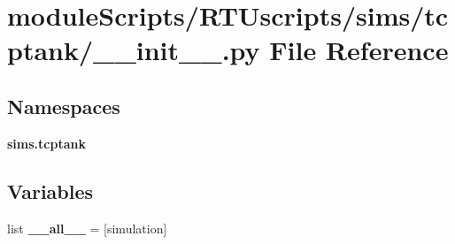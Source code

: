 \section{module\+Scripts/\+R\+T\+Uscripts/sims/tcptank/\+\_\+\+\_\+init\+\_\+\+\_\+.py File Reference}
\label{sims_2tcptank_2____init_____8py}
\subsection*{Namespaces}
\begin{DoxyCompactItemize}
\item 
 {\bf sims.\+tcptank}
\end{DoxyCompactItemize}
\subsection*{Variables}
\begin{DoxyCompactItemize}
\item 
list {\bf \+\_\+\+\_\+all\+\_\+\+\_\+} = [\textquotesingle{}simulation\textquotesingle{}]
\end{DoxyCompactItemize}
